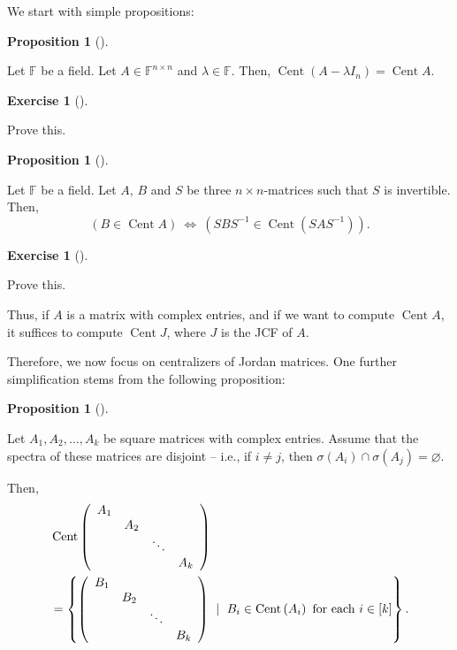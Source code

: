 \documentclass[numbers=enddot,12pt,final,onecolumn,notitlepage]{scrartcl}%
\newcounter{exer}
\numberwithin{exer}{subsection}
\theoremstyle{definition}
\newtheorem{prop}[theo]{Proposition}
\newenvironment{proposition}[1][]
{\begin{prop}[#1]\begin{leftbar}}
{\end{leftbar}\end{prop}}
\newtheorem{exmp}[exer]{Exercise}
\newenvironment{exercise}[1][]
{\begin{exmp}[#1]\begin{leftbar}}
{\end{leftbar}\end{exmp}}
\begin{document}
We start with simple propositions:

\begin{proposition}
\label{prop.jnf.cent.lambda}Let $\mathbb{F}$ be a field. Let $A\in
\mathbb{F}^{n\times n}$ and $\lambda\in\mathbb{F}$. Then,
$\operatorname*{Cent}\left(  A-\lambda I_{n}\right)  =\operatorname*{Cent}A$.
\end{proposition}

\begin{exercise}
 Prove this.
\end{exercise}

\begin{proposition}
\label{prop.jnf.cent.similar}Let $\mathbb{F}$ be a field. Let $A$, $B$ and $S$
be three $n\times n$-matrices such that $S$ is invertible. Then,
\[
\left(  B\in\operatorname*{Cent}A\right)  \ \Longleftrightarrow\ \left(
SBS^{-1}\in\operatorname*{Cent}\left(  SAS^{-1}\right)  \right)  .
\]

\end{proposition}

\begin{exercise}
 Prove this.
\end{exercise}

Thus, if $A$ is a matrix with complex entries, and if we want to compute
$\operatorname*{Cent}A$, it suffices to compute $\operatorname*{Cent}J$, where
$J$ is the JCF of $A$.

Therefore, we now focus on centralizers of Jordan matrices. One further
simplification stems from the following proposition:

\begin{proposition}
\label{prop.jnf.cent.block-separate}Let $A_{1},A_{2},\ldots,A_{k}$ be square
matrices with complex entries. Assume that the spectra of these matrices are
disjoint -- i.e., if $i\neq j$, then $\sigma\left(  A_{i}\right)  \cap
\sigma\left(  A_{j}\right)  =\varnothing$.

Then,%
\begin{align*}
&  \operatorname*{Cent}\left(
\begin{array}
[c]{cccc}%
A_{1} &  &  & \\
& A_{2} &  & \\
&  & \ddots & \\
&  &  & A_{k}%
\end{array}
\right) \\
&  =\left\{  \left(
\begin{array}
[c]{cccc}%
B_{1} &  &  & \\
& B_{2} &  & \\
&  & \ddots & \\
&  &  & B_{k}%
\end{array}
\right)  \ \mid\ B_{i}\in\operatorname*{Cent}\left(  A_{i}\right)  \text{ for
each }i\in\left[  k\right]  \right\}  .
\end{align*}

\end{proposition}
\end{document}
